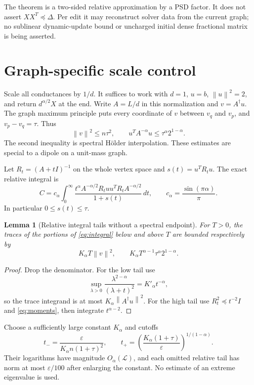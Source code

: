 \documentclass[11pt]{article}
\newtheorem{lemma}[theorem]{Lemma}
\newcommand{\norm}[1]{\left\lVert#1\right\rVert}
\begin{document}
The theorem is a two-sided relative approximation by a PSD factor.
It does not assert $XX^T\preceq\Delta$. Per edit it may reconstruct
solver data from the current graph; no sublinear dynamic-update bound
or uncharged initial dense fractional matrix is being asserted.

\section{Graph-specific scale control}
Scale all conductances by $1/d$. It suffices to work with $d=1$,
$u=b$, $\norm u^2=2$, and return $d^{\alpha/2}X$ at the end.
Write $A=L/d$ in this normalization and $v=A^\dagger u$.
The graph maximum principle puts every coordinate of $v$ between
$v_q$ and $v_p$, and $v_p-v_q=\tau$. Thus
\begin{equation}\label{eq:moments}
 \norm v^2\le n\tau^2,\qquad
 u^TA^{-\alpha}u\le\tau^\alpha 2^{1-\alpha}.
\end{equation}
The second inequality is spectral H\"older interpolation.
These estimates are special to a dipole on a unit-mass graph.

Let $R_t=(A+tI)^{-1}$ on the whole vertex space and
$s(t)=u^TR_tu$. The exact relative integral is
\begin{equation}\label{eq:integral}
 C=c_\alpha\int_0^\infty
 \frac{t^\alpha A^{-\alpha/2}R_tuu^TR_tA^{-\alpha/2}}
 {1+s(t)}\,dt,\qquad c_\alpha=\frac{\sin(\pi\alpha)}\pi.
\end{equation}
In particular $0\le s(t)\le\tau$.

\begin{lemma}[Relative integral tails without a spectral endpoint]
For $T>0$, the traces of the portions of \eqref{eq:integral} below
and above $T$ are bounded respectively by
\[
 K_\alpha T\norm v^2,\qquad
 K_\alpha T^{\alpha-1}\tau^\alpha2^{1-\alpha}.
\]
\end{lemma}
\begin{proof}
Drop the denominator. For the low tail use
\[
 \sup_{\lambda>0}
 \frac{\lambda^{2-\alpha}}{(\lambda+t)^2}
 =K'_\alpha t^{-\alpha},
\]
so the trace integrand is at most $K_\alpha\norm{A^\dagger u}^2$.
For the high tail use $R_t^2\preceq t^{-2}I$ and
\eqref{eq:moments}, then integrate $t^{\alpha-2}$.
\end{proof}

Choose a sufficiently large constant $K_\alpha$ and cutoffs
\begin{equation}\label{eq:cutoff}
 t_- = \frac{\varepsilon}{K_\alpha n(1+\tau)^2},\qquad
 t_+ = \left(\frac{K_\alpha(1+\tau)}\varepsilon\right)^{1/(1-\alpha)}.
\end{equation}
Their logarithms have magnitude $O_\alpha(\mathcal L)$, and each
omitted relative tail has norm at most $\varepsilon/100$ after enlarging
the constant. No estimate of an extreme eigenvalue is used.
\end{document}
